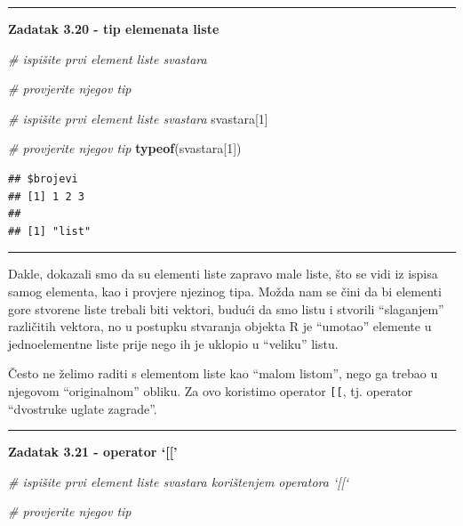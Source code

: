 \documentclass[]{book}
\newenvironment{Shaded}{\begin{snugshade}}{\end{snugshade}}
\newcommand{\KeywordTok}[1]{\textcolor[rgb]{0.13,0.29,0.53}{\textbf{#1}}}
\newcommand{\DecValTok}[1]{\textcolor[rgb]{0.00,0.00,0.81}{#1}}
\newcommand{\CommentTok}[1]{\textcolor[rgb]{0.56,0.35,0.01}{\textit{#1}}}
\newcommand{\NormalTok}[1]{#1}
\theoremstyle{definition}
\theoremstyle{definition}
\theoremstyle{definition}
\theoremstyle{remark}
\begin{document}
\begin{center}\rule{0.5\linewidth}{\linethickness}\end{center}

\textbf{Zadatak 3.20 - tip elemenata liste}

\begin{Shaded}
\begin{Highlighting}[]
\CommentTok{# ispišite prvi element liste svastara }

\CommentTok{# provjerite njegov tip}
\end{Highlighting}
\end{Shaded}

\begin{Shaded}
\begin{Highlighting}[]
\CommentTok{# ispišite prvi element liste svastara }
\NormalTok{svastara[}\DecValTok{1}\NormalTok{]}

\CommentTok{# provjerite njegov tip}
\KeywordTok{typeof}\NormalTok{(svastara[}\DecValTok{1}\NormalTok{])}
\end{Highlighting}
\end{Shaded}

\begin{verbatim}
## $brojevi
## [1] 1 2 3
## 
## [1] "list"
\end{verbatim}

\begin{center}\rule{0.5\linewidth}{\linethickness}\end{center}

Dakle, dokazali smo da su elementi liste zapravo male liste, što se vidi
iz ispisa samog elementa, kao i provjere njezinog tipa. Možda nam se
čini da bi elementi gore stvorene liste trebali biti vektori, budući da
smo listu i stvorili ``slaganjem'' različitih vektora, no u postupku
stvaranja objekta R je ``umotao'' elemente u jednoelementne liste prije
nego ih je uklopio u ``veliku'' listu.

Često ne želimo raditi s elementom liste kao ``malom listom'', nego ga
trebao u njegovom ``originalnom'' obliku. Za ovo koristimo operator
\texttt{{[}{[}}, tj. operator ``dvostruke uglate zagrade''.

\begin{center}\rule{0.5\linewidth}{\linethickness}\end{center}

\textbf{Zadatak 3.21 - operator `{[}{[}'}

\begin{Shaded}
\begin{Highlighting}[]
\CommentTok{# ispišite prvi element liste svastara korištenjem  operatora `[[`}


\CommentTok{# provjerite njegov tip}
\end{Highlighting}
\end{Shaded}
\end{document}
